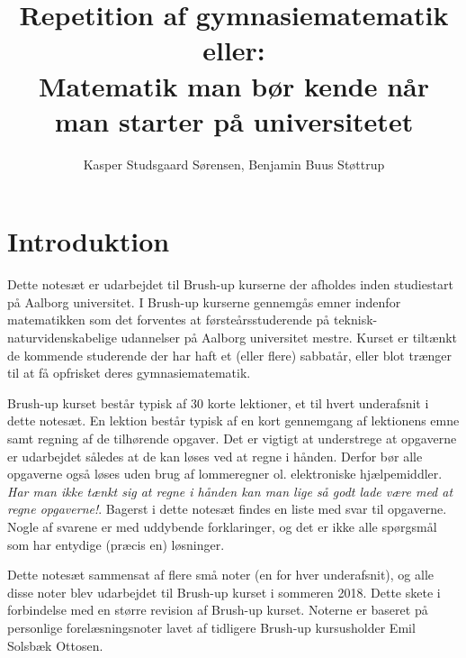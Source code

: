 

\title{Repetition af gymnasiematematik\\\large eller:\\ \Large Matematik man bør kende når man starter på universitetet}
\author{Kasper Studsgaard Sørensen, Benjamin Buus Støttrup}

\pagestyle{plain}
\maketitle
{}
\tableofcontents
\chapter*{Introduktion}\normalsize
Dette notesæt er udarbejdet til Brush-up kurserne der afholdes inden studiestart på Aalborg universitet. I Brush-up kurserne gennemgås emner indenfor matematikken som det forventes at førsteårsstuderende på teknisk-naturvidenskabelige udannelser på Aalborg universitet mestre. Kurset er tiltænkt de kommende studerende der har haft et (eller flere) sabbatår, eller blot trænger til at få opfrisket deres gymnasiematematik. 

Brush-up kurset består typisk af 30 korte lektioner, et til hvert underafsnit i dette notesæt. En lektion består typisk af en kort gennemgang af lektionens emne samt regning af de tilhørende opgaver. Det er vigtigt at understrege at opgaverne er udarbejdet således at de kan løses ved at regne i hånden. Derfor bør alle opgaverne også løses uden brug af lommeregner ol. elektroniske hjælpemiddler. \emph{Har man ikke tænkt sig at regne i hånden kan man lige så godt lade være med at regne opgaverne!}. Bagerst i dette notesæt findes en liste med svar til opgaverne. Nogle af svarene er med uddybende forklaringer, og det er ikke alle spørgsmål som har entydige (præcis en) løsninger.

Dette notesæt sammensat af flere små noter (en for hver underafsnit), og alle disse noter blev udarbejdet til Brush-up kurset i sommeren 2018. Dette skete i forbindelse med en større revision af Brush-up kurset. Noterne er baseret på personlige forelæsningsnoter lavet af tidligere Brush-up kursusholder Emil Solsbæk Ottosen. 


\pagestyle{fancy}
